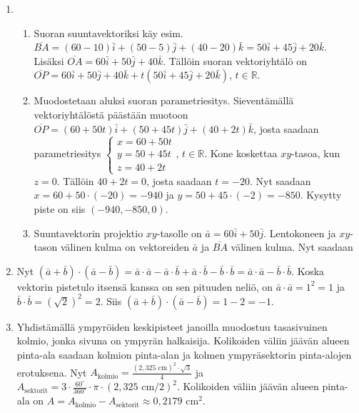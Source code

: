 \documentclass[12pt,fleqn]{article}
\begin{document}
\begin{enumerate}[label=\textbf{\arabic*.}]
\item
\begin{enumerate}[label=\textbf{\alph*)}]
\item Suoran suuntavektoriksi käy esim. \(\overline{BA}=(60-10)\bar{i}+(50-5)\bar{j}+(40-20)\bar{k}=50\bar{i}+45\bar{j}+20\bar{k}\). Lisäksi \(\overline{OA}=60\bar{i}+50\bar{j}+40\bar{k}\). Tällöin suoran vektoriyhtälö on \(\overline{OP}=60\bar{i}+50\bar{j}+40\bar{k}+t(50\bar{i}+45\bar{j}+20\bar{k})\), \(t\in \mathbb{R}\).

\item Muodostetaan aluksi suoran parametriesitys. Sieventämällä vektoriyhtälöstä päästään muotoon \(\overline{OP}=(60+50t)\bar{i}+(50+45t)\bar{j}+(40+2t)\bar{k}\), josta saadaan parametriesitys \(
\begin{cases}
x=60+50t \\
y=50+45t \\
z=40+2t 
\end{cases}
\), \(t\in \mathbb{R}\). Kone koskettaa \(xy\)-tasoa, kun \(z=0\). Tällöin \(40+2t=0\), josta saadaan \(t=-20\). Nyt saadaan \(x=60+50\cdot (-20)=-940\) ja \(y=50+45\cdot (-2)=-850\). Kysytty piste on siis \((-940,-850,0)\).

\item Suuntavektorin projektio \(xy\)-tasolle on \(\bar{a}=60\bar{i}+50\bar{j}\). Lentokoneen ja \(xy\)-tason välinen kulma on vektoreiden \(\bar{a}\) ja \(\overline{BA}\) välinen kulma. Nyt saadaan
\end{enumerate}

\item Nyt \((\bar{a}+\bar{b})\cdot (\bar{a}-\bar{b})=\bar{a}\cdot \bar{a}-\bar{a}\cdot \bar{b}+\bar{a}\cdot \bar{b}-\bar{b}\cdot \bar{b}=\bar{a}\cdot \bar{a}-\bar{b}\cdot \bar{b}\). Koska vektorin pistetulo itsensä kanssa on sen pituuden neliö, on \(\bar{a}\cdot \bar{a}=1^2=1\) ja \(\bar{b}\cdot \bar{b}=(\sqrt{2})^2=2\). Siis \((\bar{a}+\bar{b})\cdot (\bar{a}-\bar{b})=1-2=-1\).

\item Yhdistämällä ympyröiden keskipisteet janoilla muodostuu tasasivuinen kolmio, jonka sivuna on ympyrän halkaisija. Kolikoiden väliin jäävän alueen pinta-ala saadaan kolmion pinta-alan ja kolmen ympyräsektorin pinta-alojen erotuksena. Nyt \(A_\mathrm{kolmio}=\frac{(2,325\text{ cm})^2\cdot \sqrt{3}}{4}\) ja \(A_\mathrm{sektorit}=3\cdot \frac{60^{\circ}}{360^{\circ}}\cdot \pi \cdot (2,325\text{ cm}/2)^2\). Kolikoiden väliin jäävän alueen pinta-ala on \(A=A_\mathrm{kolmio}-A_\mathrm{sektorit}\approx 0,2179\text{ cm}^2\).


\end{enumerate}
\end{document}
